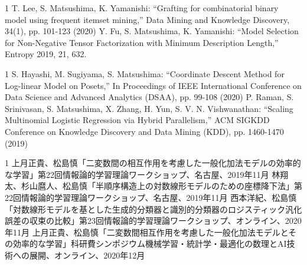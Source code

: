 \begin{雑誌論文}{1}
T. Lee, S. Matsushima, K. Yamanishi: “Grafting for combinatorial binary model using frequent itemset mining,” Data Mining and Knowledge Discovery, 34(1), pp. 101-123 (2020)
Y. Fu, S. Matsushima, K. Yamanishi: “Model Selection for Non-Negative Tensor Factorization with Minimum Description Length,” Entropy 2019, 21, 632.
\end{雑誌論文}
\begin{査読付}{1}
S. Hayashi, M. Sugiyama, S. Matsushima: “Coordinate Descent Method for Log-linear Model on Posets,”  In Proceedings of IEEE International Conference on Data Science and Advanced Analytics (DSAA), pp. 99-108 (2020)
P. Raman, S. Srinivasan, S. Matsushima, X. Zhang, H. Yun, S. V. N. Vishwanathan: “Scaling Multinomial Logistic Regression via Hybrid Parallelism,” ACM SIGKDD Conference on Knowledge Discovery and Data Mining (KDD), pp. 1460-1470 (2019)

\end{査読付}

\begin{発表}{1}
 上月正貴、松島慎「二変数間の相互作用を考慮した一般化加法モデルの効率的な学習」第22回情報論的学習理論ワークショップ、名古屋、2019年11月
 林翔太、杉山麿人、松島慎「半順序構造上の対数線形モデルのための座標降下法」第22回情報論的学習理論ワークショップ、名古屋、2019年11月
 西本洋紀、松島慎「対数線形モデルを基とした生成的分類器と識別的分類器のロジスティック汎化誤差の収束の比較」第23回情報論的学習理論ワークショップ、オンライン、2020年11月
 上月正貴、松島慎「二変数間相互作用を考慮した一般化加法モデルとその効率的な学習」科研費シンポジウム機械学習・統計学・最適化の数理とAI技術への展開、オンライン、2020年12月
\end{発表}

